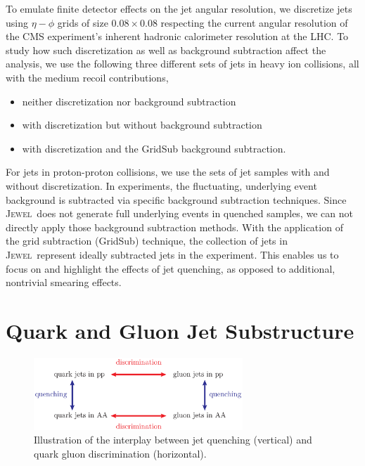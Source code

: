 \documentclass[notoc,preprintnumbers]{JHEP3}
\newcommand{\jw}{\textsc{Jewel}~}
\begin{document}
To emulate finite detector effects on the jet angular resolution, we discretize jets using $\eta-\phi$ grids of size $0.08 \times 0.08$ respecting the current angular resolution of the CMS experiment's inherent hadronic calorimeter resolution at the LHC. To study how such discretization as well as background subtraction affect the analysis, we use the following three different sets of jets in heavy ion collisions, all with the medium recoil contributions,
\begin{itemize}
	\item neither discretization nor background subtraction
	\item with discretization but without background subtraction
	\item with discretization and the GridSub \cite{KunnawalkamElayavalli:2017hxo} background subtraction.
\end{itemize}
For jets in proton-proton collisions, we use the sets of jet samples with and without discretization. In experiments, the fluctuating, underlying event background is subtracted via specific background subtraction techniques. Since \jw does not generate full underlying events in quenched samples, we can not directly apply those background subtraction methods. With the application of the grid subtraction (GridSub) technique, the collection of jets in \jw represent ideally subtracted jets in the experiment. This enables us to focus on and highlight the effects of jet quenching, as opposed to additional, nontrivial smearing effects.

\section{Quark and Gluon Jet Substructure}
\label{sec:qg}
\begin{figure}[t]
	   \centering
	   \includegraphics[width=0.7\textwidth]{plots/qg_HI}
	   \caption{Illustration of the interplay between jet quenching (vertical) and quark gluon discrimination (horizontal). }
	   \label{fig:quenching_discrimination}
\end{figure}
\end{document}
